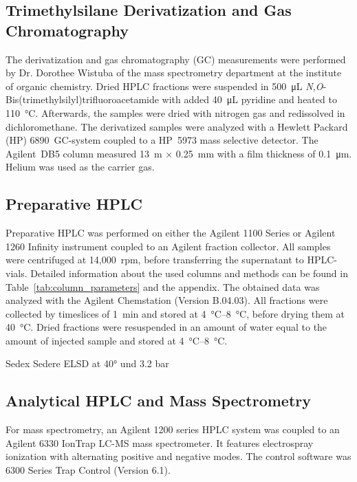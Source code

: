 	\subsection{Trimethylsilane Derivatization and Gas Chromatography} %
	\label{sub:trimethylsilane_derivatization_and_gas_chromatography}

	The derivatization and gas chromatography (GC) measurements were performed by Dr. Dorothee Wistuba of the mass spectrometry department at the institute of organic chemistry.
	Dried HPLC fractions were suspended in \SI{500}{\micro\liter} \emph{N,O}-Bis(trimethylsilyl)\-trifluoro\-acetamide with added \SI{40}{\micro\liter} pyridine and heated to \SI{110}{\celsius}. Afterwards, the samples were dried with nitrogen gas and redissolved in dichloromethane.
	The derivatized samples were analyzed with a Hewlett Packard (HP) 6890~GC-system coupled to a HP~5973 mass selective detector. The Agilent~DB5 column measured 13~m $\times$ 0.25~mm with a film thickness of \SI{0.1}{\micro\meter}. Helium was used as the carrier gas.

	\subsection{Preparative HPLC} %
	\label{sub:preparative_hplc}

	Preparative HPLC was performed on either the Agilent 1100 Series or Agilent 1260 Infinity instrument coupled to an Agilent  fraction collector. All samples were centrifuged at 14,000~rpm, before transferring the supernatant to HPLC-vials. Detailed information about the used columns and methods can be found in Table~\ref{tab:column_parameters} and the appendix. The obtained data was analyzed with the Agilent Chemstation (Version B.04.03).
	All fractions were collected by timeslices of \SI{1}{\minute} and stored at \SIrange{4}{8}{\celsius}, before drying them at \SI{40}{\celsius}. Dried fractions were resuspended in an amount of water equal to the amount of injected sample and stored at \SIrange{4}{8}{\celsius}.

	Sedex Sedere ELSD at 40° und 3.2 bar


	\subsection{Analytical HPLC and Mass Spectrometry} %
	\label{sub:analytical_hplc_and_mass_spectrometry}


	For mass spectrometry, an Agilent 1200 series HPLC system was coupled to an Agilent 6330 IonTrap LC-MS mass spectrometer. It features electrospray ionization with alternating positive and negative modes. The control software was 6300 Series Trap Control (Version 6.1).

